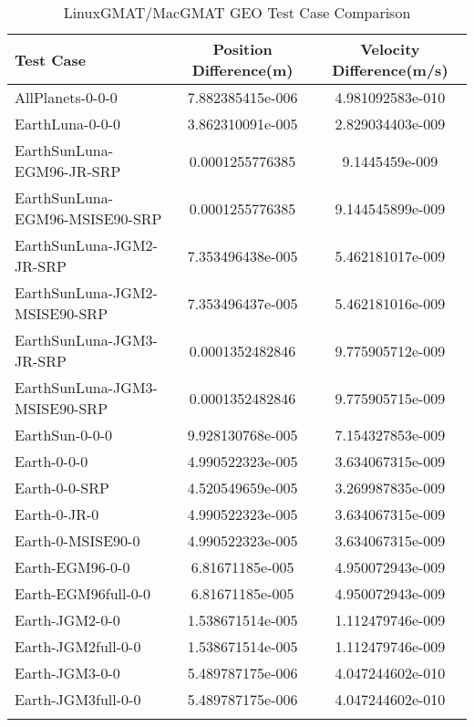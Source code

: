 \begin{table}[htbp!]
\centering
\caption{ LinuxGMAT/MacGMAT GEO Test Case Comparison}
      \begin{tabular}{lcc}
      \hline\hline
          Test Case & Position Difference(m) & Velocity Difference(m/s) \\
         \hline
         AllPlanets-0-0-0 & 7.882385415e-006 & 4.981092583e-010 \\
         EarthLuna-0-0-0 & 3.862310091e-005 & 2.829034403e-009 \\
         EarthSunLuna-EGM96-JR-SRP & 0.0001255776385 & 9.1445459e-009 \\
         EarthSunLuna-EGM96-MSISE90-SRP & 0.0001255776385 & 9.144545899e-009 \\
         EarthSunLuna-JGM2-JR-SRP & 7.353496438e-005 & 5.462181017e-009 \\
         EarthSunLuna-JGM2-MSISE90-SRP & 7.353496437e-005 & 5.462181016e-009 \\
         EarthSunLuna-JGM3-JR-SRP & 0.0001352482846 & 9.775905712e-009 \\
         EarthSunLuna-JGM3-MSISE90-SRP & 0.0001352482846 & 9.775905715e-009 \\
         EarthSun-0-0-0 & 9.928130768e-005 & 7.154327853e-009 \\
         Earth-0-0-0 & 4.990522323e-005 & 3.634067315e-009 \\
         Earth-0-0-SRP & 4.520549659e-005 & 3.269987835e-009 \\
         Earth-0-JR-0 & 4.990522323e-005 & 3.634067315e-009 \\
         Earth-0-MSISE90-0 & 4.990522323e-005 & 3.634067315e-009 \\
         Earth-EGM96-0-0 & 6.81671185e-005 & 4.950072943e-009 \\
         Earth-EGM96full-0-0 & 6.81671185e-005 & 4.950072943e-009 \\
         Earth-JGM2-0-0 & 1.538671514e-005 & 1.112479746e-009 \\
         Earth-JGM2full-0-0 & 1.538671514e-005 & 1.112479746e-009 \\
         Earth-JGM3-0-0 & 5.489787175e-006 & 4.047244602e-010 \\
         Earth-JGM3full-0-0 & 5.489787175e-006 & 4.047244602e-010 \\
      \hline\hline
      \label{Table: GEO LinuxGMAT-MacGMAT Table} 
\end{tabular}
\end{table}
